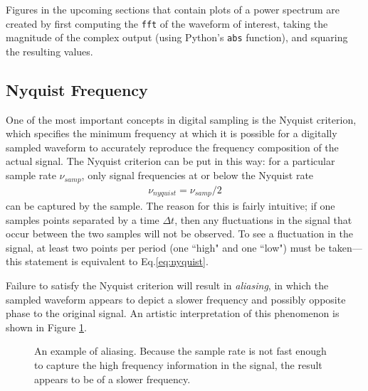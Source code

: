 \documentclass[12pt]{article}
\begin{document}
Figures in the upcoming sections that contain plots of a power spectrum are created by first computing the \texttt{fft} of the waveform of interest, taking the magnitude of the complex output (using Python's \texttt{abs} function), and squaring the resulting values.

\subsection{Nyquist Frequency}
One of the most important concepts in digital sampling is the Nyquist criterion, which specifies the minimum frequency at which it is possible for a digitally sampled waveform to accurately reproduce the frequency composition of the actual signal. The Nyquist criterion can be put in this way: for a particular sample rate $\nu_{samp}$, only signal frequencies at or below the Nyquist rate
\begin{eqnarray}
 \nu_{nyquist} = \nu_{samp} / 2 \label{eq:nyquist}
\end{eqnarray}
can be captured by the sample. The reason for this is fairly intuitive; if one samples points separated by a time $\Delta{t}$, then any fluctuations in the signal that occur between the two samples will not be observed. To see a fluctuation in the signal, at least two points per period (one ``high" and one ``low") must be taken---this statement is equivalent to Eq.\ref{eq:nyquist}.

Failure to satisfy the Nyquist criterion will result in \textit{aliasing}, in which the sampled waveform appears to depict a slower frequency and possibly opposite phase to the original signal. An artistic interpretation of this phenomenon is shown in Figure \ref{fig:aliasing}.
\begin{figure}[H]
\caption[SODUMB]{An example of aliasing. Because the sample rate is not fast enough to capture the high frequency information in the signal, the result appears to be of a slower frequency.}
\label{fig:aliasing}
\end{figure}
\end{document}
